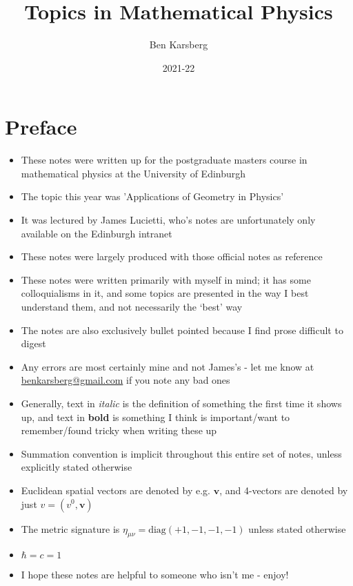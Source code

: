 \documentclass[12pt,a4paper]{article}
\title{Topics in Mathematical Physics}
\author{Ben Karsberg}
\date{2021-22}
\numberwithin{equation}{section}
\begin{document}
	\maketitle
	\section{Preface}
	\begin{itemize}
		\item These notes were written up for the postgraduate masters course in mathematical physics at the University of Edinburgh
		\item The topic this year was 'Applications of Geometry in Physics'
		\item It was lectured by James Lucietti, who's notes are unfortunately only available on the Edinburgh intranet
		\item These notes were largely produced with those official notes as reference
		\item These notes were written primarily with myself in mind; it has some colloquialisms in it, and some topics are presented in the way I best understand them, and not necessarily the `best' way
		\item The notes are also exclusively bullet pointed because I find prose difficult to digest
		\item Any errors are most certainly mine and not James's - let me know at \href{mailto:benkarsberg@gmail.com}{benkarsberg@gmail.com} if you note any bad ones
		\item Generally, text in \textit{italic} is the definition of something the first time it shows up, and text in \textbf{bold} is something I think is important/want to remember/found tricky when writing these up
		\item Summation convention is implicit throughout this entire set of notes, unless explicitly stated otherwise
		\item Euclidean spatial vectors are denoted by e.g. $\mathbf{v}$, and 4-vectors are denoted by just $v=(v^{0},\mathbf{v})$
		\item The metric signature is $\eta_{\mu\nu}=\text{diag}(+1,-1,-1,-1)$ unless stated otherwise
		\item $\hbar=c=1$
		\item I hope these notes are helpful to someone who isn't me - enjoy!
	\end{itemize}
	\newpage
\end{document}
